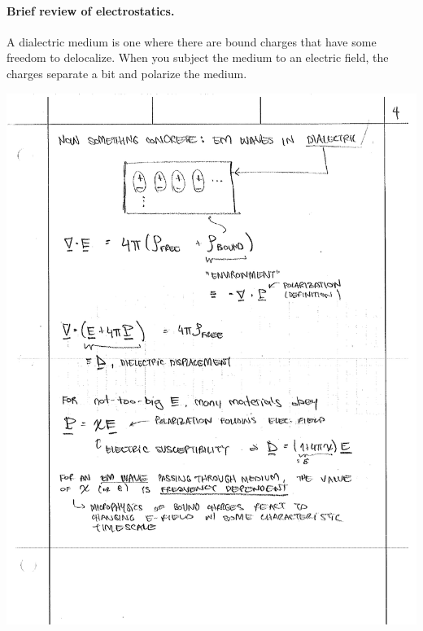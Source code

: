 \paragraph{Brief review of electrostatics.}
A dialectric medium is one where there are bound charges that have some freedom to delocalize. When you subject the medium to an electric field, the charges separate a bit and polarize the medium.

\begin{center}
\includegraphics[width=.7\textwidth]{figures/Kramers_01.pdf}
\end{center}

